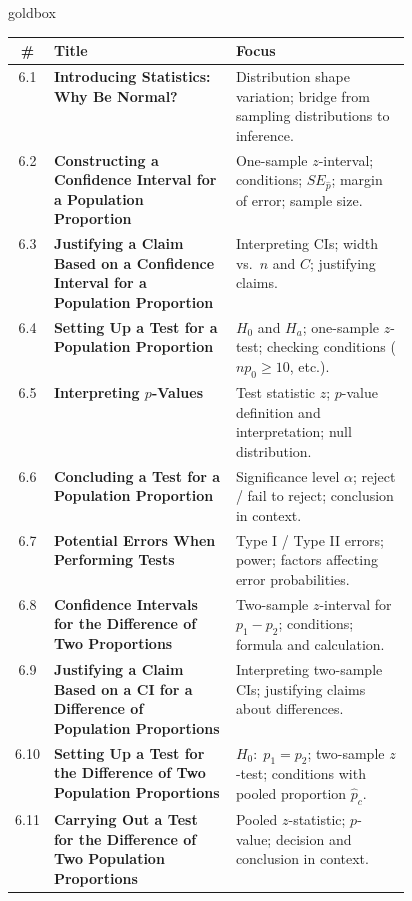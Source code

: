 \documentclass[10pt]{article}
\begin{document}
\renewcommand{\arraystretch}{1.6}
\begin{skillbox}{goldbox}
\begin{tabularx}{\linewidth}{@{} c >{\bfseries}p{0.46\linewidth} X @{}}
  \textbf{\#} & \textbf{Title} & \textbf{Focus} \\
  \hline
  6.1  & Introducing Statistics: Why Be Normal?
       & Distribution shape variation; bridge from sampling distributions to inference. \\
  \hline
  6.2  & Constructing a Confidence Interval for a Population Proportion
       & One-sample $z$-interval; conditions; $SE_{\hat p}$; margin of error; sample size. \\
  \hline
  6.3  & Justifying a Claim Based on a Confidence Interval for a Population Proportion
       & Interpreting CIs; width vs.\ $n$ and $C$; justifying claims. \\
  \hline
  6.4  & Setting Up a Test for a Population Proportion
       & $H_0$ and $H_a$; one-sample $z$-test; checking conditions ($np_0 \ge 10$, etc.). \\
  \hline
  6.5  & Interpreting $p$-Values
       & Test statistic $z$; $p$-value definition and interpretation; null distribution. \\
  \hline
  6.6  & Concluding a Test for a Population Proportion
       & Significance level $\alpha$; reject / fail to reject; conclusion in context. \\
  \hline
  6.7  & Potential Errors When Performing Tests
       & Type I / Type II errors; power; factors affecting error probabilities. \\
  \hline
  6.8  & Confidence Intervals for the Difference of Two Proportions
       & Two-sample $z$-interval for $p_1 - p_2$; conditions; formula and calculation. \\
  \hline
  6.9  & Justifying a Claim Based on a CI for a Difference of Population Proportions
       & Interpreting two-sample CIs; justifying claims about differences. \\
  \hline
  6.10 & Setting Up a Test for the Difference of Two Population Proportions
       & $H_0{:}\;p_1 = p_2$; two-sample $z$-test; conditions with pooled proportion $\hat p_c$. \\
  \hline
  6.11 & Carrying Out a Test for the Difference of Two Population Proportions
       & Pooled $z$-statistic; $p$-value; decision and conclusion in context. \\
  \hline
\end{tabularx}
\end{skillbox}
\end{document}
